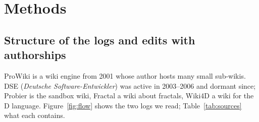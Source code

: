 \documentclass[10pt,a4paper]{article}
\begin{document}
\section{Methods}

\subsection{Structure of the logs and edits with authorships}

ProWiki is a wiki engine from 2001 whose author hosts many small sub-wikis. DSE (\emph{Deutsche Software-Entwickler}) was active in 2003--2006 and dormant since; Probier is the sandbox wiki, Fractal a wiki about fractals, Wiki4D a wiki for the D language. Figure~\ref{fig:flow} shows the two logs we read; Table~\ref{tab:sources} what each contains.
\end{document}
